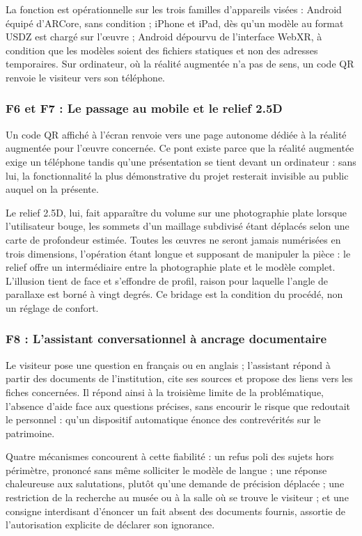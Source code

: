 La fonction est opérationnelle sur les trois familles d'appareils visées :
Android équipé d'ARCore, sans condition ; iPhone et iPad, dès qu'un modèle au
format USDZ est chargé sur l'œuvre ; Android dépourvu de l'interface WebXR, à
condition que les modèles soient des fichiers statiques et non des adresses
temporaires. Sur ordinateur, où la réalité augmentée n'a pas de sens, un code QR
renvoie le visiteur vers son téléphone.

\subsubsection{F6 et F7 : Le passage au mobile et le relief 2.5D}

Un code QR affiché à l'écran renvoie vers une page autonome dédiée à la réalité
augmentée pour l'œuvre concernée. Ce pont existe parce que la réalité augmentée
exige un téléphone tandis qu'une présentation se tient devant un ordinateur :
sans lui, la fonctionnalité la plus démonstrative du projet resterait invisible
au public auquel on la présente.

Le relief 2.5D, lui, fait apparaître du volume sur une photographie plate
lorsque l'utilisateur bouge, les sommets d'un maillage subdivisé étant déplacés
selon une carte de profondeur estimée. Toutes les œuvres ne seront jamais
numérisées en trois dimensions, l'opération étant longue et supposant de
manipuler la pièce : le relief offre un intermédiaire entre la photographie
plate et le modèle complet. L'illusion tient de face et s'effondre de profil,
raison pour laquelle l'angle de parallaxe est borné à vingt degrés. Ce bridage
est la condition du procédé, non un réglage de confort.

\subsubsection{F8 : L'assistant conversationnel à ancrage documentaire}

Le visiteur pose une question en français ou en anglais ; l'assistant répond à
partir des documents de l'institution, cite ses sources et propose des liens
vers les fiches concernées. Il répond ainsi à la troisième limite de la
problématique, l'absence d'aide face aux questions précises, sans encourir le
risque que redoutait le personnel : qu'un dispositif automatique énonce des
contrevérités sur le patrimoine.

Quatre mécanismes concourent à cette fiabilité : un refus poli des sujets hors
périmètre, prononcé sans même solliciter le modèle de langue ; une réponse
chaleureuse aux salutations, plutôt qu'une demande de précision déplacée ; une
restriction de la recherche au musée ou à la salle où se trouve le visiteur ; et
une consigne interdisant d'énoncer un fait absent des documents fournis,
assortie de l'autorisation explicite de déclarer son ignorance.

